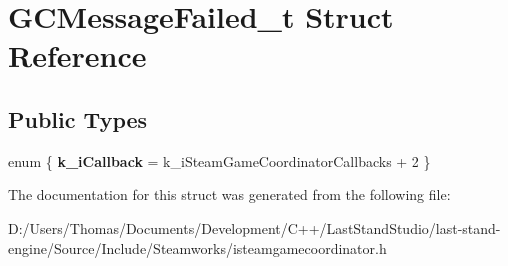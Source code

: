 \hypertarget{structGCMessageFailed__t}{}\section{G\+C\+Message\+Failed\+\_\+t Struct Reference}
\label{structGCMessageFailed__t}
\subsection*{Public Types}
\begin{DoxyCompactItemize}
\item 
\hypertarget{structGCMessageFailed__t_a08a72f87a5797cc469bf3910bc18d329}{}enum \{ {\bfseries k\+\_\+i\+Callback} = k\+\_\+i\+Steam\+Game\+Coordinator\+Callbacks + 2
 \}\label{structGCMessageFailed__t_a08a72f87a5797cc469bf3910bc18d329}

\end{DoxyCompactItemize}


The documentation for this struct was generated from the following file\+:\begin{DoxyCompactItemize}
\item 
D\+:/\+Users/\+Thomas/\+Documents/\+Development/\+C++/\+Last\+Stand\+Studio/last-\/stand-\/engine/\+Source/\+Include/\+Steamworks/isteamgamecoordinator.\+h\end{DoxyCompactItemize}
